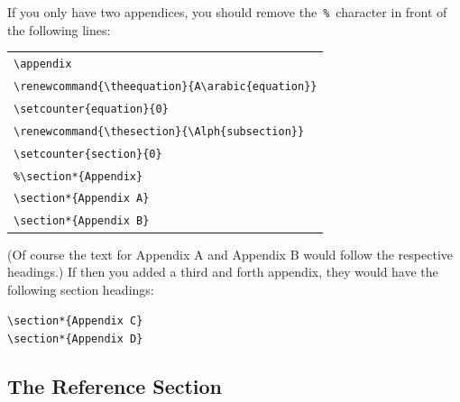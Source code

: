 \documentclass[titlepage,12pt]{article}
\begin{document}
\noindent If you only have two appendices, you should remove
the~\verb=%=~character in front of the following lines:


\begin{center}
{}
\begin{tabular}{l}
\verb=\appendix= \\
\verb=\renewcommand{\theequation}{A\arabic{equation}}=  \\
\verb=\setcounter{equation}{0}=  \\
\verb=\renewcommand{\thesection}{\Alph{subsection}}= \\
\verb=\setcounter{section}{0}= \\
\verb=%\section*{Appendix}= \\
\verb=\section*{Appendix A}= \\
\verb=\section*{Appendix B}= \\
\end{tabular}
\end{center}
{}

\noindent (Of course the text for Appendix A and Appendix B would
follow the respective headings.) If then you added a third and
forth appendix, they would have the following section headings:

\hspace{6em}\verb=\section*{Appendix C}=  \\[1ex]
\hspace{6em}\verb=\section*{Appendix D}= \\


\subsection{The Reference Section}
\end{document}
